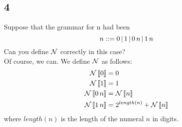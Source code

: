 \subsection{4}

Suppose that the grammar for n had been
$$n\space::= 0 \,|\, 1 \,|\, 0 \, n \,|\, 1 \, n$$
Can you define $\N$ correctly in this case?\\

Of course, we can. We define $\N$ as follows:
\begin{align*}
\N\eval{0} &= 0\\
\N\eval{1} &= 1\\
\N\eval{0\,n} &= \N\eval{n}\\
\N\eval{1\,n} &= 2^{length(n)} + \N\eval{n}\\
\end{align*}
where $length(n)$ is the length of the numeral $n$ in digits.